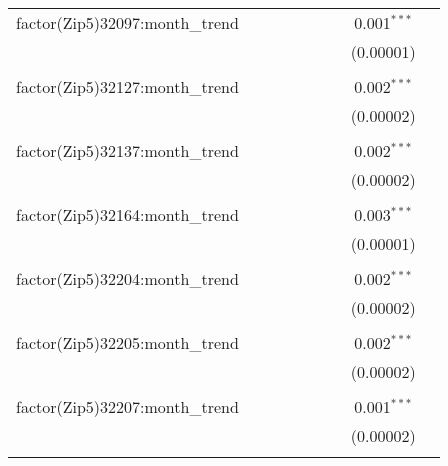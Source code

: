 \begin{table}[H]
{\begin{tabular}{@{\extracolsep{5pt}}lcccccccc}
  factor(Zip5)32097:month\_trend &  &  &  &  &  &  & 0.001$^{***}$ &  \\  

   &  &  &  &  &  &  & (0.00001) &  \\  

   & & & & & & & & \\  

  factor(Zip5)32127:month\_trend &  &  &  &  &  &  & 0.002$^{***}$ &  \\  

   &  &  &  &  &  &  & (0.00002) &  \\  

   & & & & & & & & \\  

  factor(Zip5)32137:month\_trend &  &  &  &  &  &  & 0.002$^{***}$ &  \\  

   &  &  &  &  &  &  & (0.00002) &  \\  

   & & & & & & & & \\  

  factor(Zip5)32164:month\_trend &  &  &  &  &  &  & 0.003$^{***}$ &  \\  

   &  &  &  &  &  &  & (0.00001) &  \\  

   & & & & & & & & \\  

  factor(Zip5)32204:month\_trend &  &  &  &  &  &  & 0.002$^{***}$ &  \\  

   &  &  &  &  &  &  & (0.00002) &  \\  

   & & & & & & & & \\  

  factor(Zip5)32205:month\_trend &  &  &  &  &  &  & 0.002$^{***}$ &  \\  

   &  &  &  &  &  &  & (0.00002) &  \\  

   & & & & & & & & \\  

  factor(Zip5)32207:month\_trend &  &  &  &  &  &  & 0.001$^{***}$ &  \\  

   &  &  &  &  &  &  & (0.00002) &  \\  

   & & & & & & & & \\  


\end{tabular}}
\end{table}
